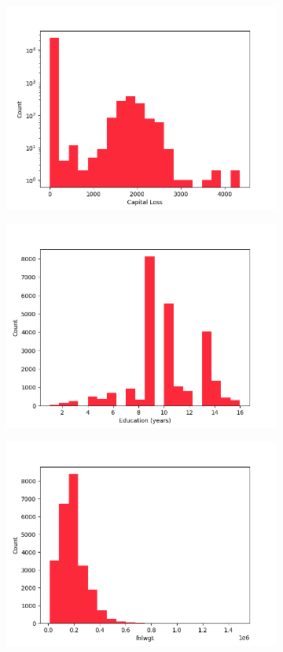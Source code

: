 \documentclass{article}
\begin{document}
\begin{figure}[H]
\begin{subfigure}{0.3\textwidth}
        \includegraphics[width=\linewidth]{img/capital-loss.png}
    \end{subfigure}
    \begin{subfigure}{0.3\textwidth}
        \includegraphics[width=\linewidth,]{img/education-num.png}
    \end{subfigure}
    \begin{subfigure}{0.3\textwidth}
        \includegraphics[width=\linewidth,]{img/fnlwgt.png}

\end{subfigure}
\end{figure}
\end{document}
